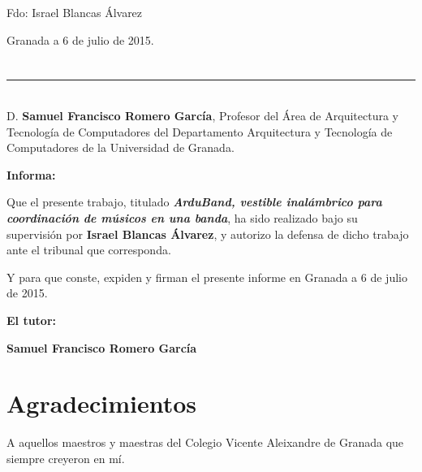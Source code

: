\noindent Fdo: Israel Blancas Álvarez

\vspace{2cm}

\begin{flushright}
Granada a 6 de julio de 2015.
\end{flushright}


\chapter*{}
\thispagestyle{empty}

\noindent\rule[-1ex]{\textwidth}{2pt}\\[4.5ex]

D. \textbf{Samuel Francisco Romero García}, Profesor del Área de Arquitectura y Tecnología de Computadores del Departamento Arquitectura y Tecnología de Computadores de la Universidad de Granada.

\vspace{0.5cm}


\vspace{0.5cm}

\textbf{Informa:}

\vspace{0.5cm}

Que el presente trabajo, titulado \textit{\textbf{ArduBand, vestible inalámbrico para coordinación de músicos en una banda}},
ha sido realizado bajo su supervisión por \textbf{Israel Blancas Álvarez}, y autorizo la defensa de dicho trabajo ante el tribunal
que corresponda.

\vspace{0.5cm}

Y para que conste, expiden y firman el presente informe en Granada a 6 de julio de 2015.

\vspace{1cm}

\textbf{El tutor:}

\vspace{5cm}

\noindent \textbf{Samuel Francisco Romero García}

\chapter*{Agradecimientos}
\thispagestyle{empty}

       \vspace{1cm}

A aquellos maestros y maestras del Colegio Vicente Aleixandre de Granada que siempre creyeron en mí.\\ \\ \\

